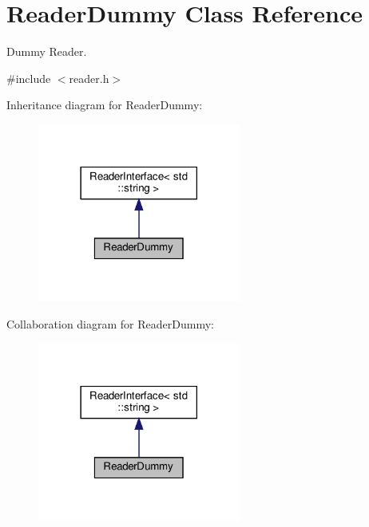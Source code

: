 \hypertarget{classReaderDummy}{}\section{Reader\+Dummy Class Reference}
\label{classReaderDummy}


Dummy Reader.  




{\ttfamily \#include $<$reader.\+h$>$}



Inheritance diagram for Reader\+Dummy\+:\nopagebreak
\begin{figure}[H]
\begin{center}
\leavevmode
\includegraphics[width=189pt]{classReaderDummy__inherit__graph}
\end{center}
\end{figure}


Collaboration diagram for Reader\+Dummy\+:\nopagebreak
\begin{figure}[H]
\begin{center}
\leavevmode
\includegraphics[width=189pt]{classReaderDummy__coll__graph}
\end{center}
\end{figure}

